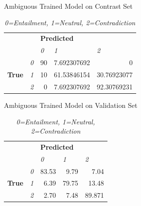\documentclass[twocolumn]{article}
\begin{document}
\begin{table}[]
    \caption{Ambiguous Trained Model on Contrast Set}
    \begin{tabular}{|ll|rrr|}
        \hline
        \multicolumn{2}{|l|}{\multirow{2}{*}{}}                           & \multicolumn{3}{l|}{\textbf{Predicted}}                                                              \\ \cline{3-5} 
        \multicolumn{2}{|l|}{}                                            & \multicolumn{1}{l|}{\textit{0}} & \multicolumn{1}{l|}{\textit{1}}  & \multicolumn{1}{l|}{\textit{2}} \\ \hline
        \multicolumn{1}{|l|}{\multirow{3}{*}{\textbf{True}}} & \textit{0} & \multicolumn{1}{r|}{90}         & \multicolumn{1}{r|}{7.692307692} & 0                               \\ \cline{2-5} 
        \multicolumn{1}{|l|}{}                               & \textit{1} & \multicolumn{1}{r|}{10}         & \multicolumn{1}{r|}{61.53846154} & 30.76923077                     \\ \cline{2-5} 
        \multicolumn{1}{|l|}{}                               & \textit{2} & \multicolumn{1}{r|}{0}          & \multicolumn{1}{r|}{7.692307692} & 92.30769231                     \\ \hline
    \end{tabular}
    \caption*{\textit{ 0=Entailment, 1=Neutral, 2=Contradiction }}
\end{table}

\begin{table}[]
    \caption{Ambiguous Trained Model on Validation Set}
    \begin{tabular}{|ll|rrr|}
        \hline
        \multicolumn{2}{|l|}{\multirow{2}{*}{}}                           & \multicolumn{3}{l|}{\textbf{Predicted}}                                                             \\ \cline{3-5} 
        \multicolumn{2}{|l|}{}                                            & \multicolumn{1}{l|}{\textit{0}} & \multicolumn{1}{l|}{\textit{1}} & \multicolumn{1}{l|}{\textit{2}} \\ \hline
        \multicolumn{1}{|l|}{\multirow{3}{*}{\textbf{True}}} & \textit{0} & \multicolumn{1}{r|}{83.53}      & \multicolumn{1}{r|}{9.79}       & 7.04                            \\ \cline{2-5} 
        \multicolumn{1}{|l|}{}                               & \textit{1} & \multicolumn{1}{r|}{6.39}       & \multicolumn{1}{r|}{79.75}      & 13.48                           \\ \cline{2-5} 
        \multicolumn{1}{|l|}{}                               & \textit{2} & \multicolumn{1}{r|}{2.70}       & \multicolumn{1}{r|}{7.48}       & 89.871                          \\ \hline
    \end{tabular}
    \caption*{\textit{ 0=Entailment, 1=Neutral, 2=Contradiction }}
\end{table}
\end{document}

